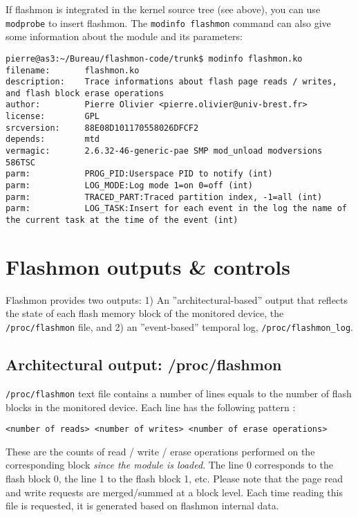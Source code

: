 \documentclass[11pt]{article}
\begin{document}
If flashmon is integrated in the kernel source tree (see above), you can use \verb+modprobe+ to insert flashmon. The \verb+modinfo flashmon+ command can also give some information about the module and its parameters:

\begin{verbatim}
pierre@as3:~/Bureau/flashmon-code/trunk$ modinfo flashmon.ko
filename:       flashmon.ko
description:    Trace informations about flash page reads / writes, and flash block erase operations
author:         Pierre Olivier <pierre.olivier@univ-brest.fr>
license:        GPL
srcversion:     88E08D101170558026DFCF2
depends:        mtd
vermagic:       2.6.32-46-generic-pae SMP mod_unload modversions 586TSC 
parm:           PROG_PID:Userspace PID to notify (int)
parm:           LOG_MODE:Log mode 1=on 0=off (int)
parm:           TRACED_PART:Traced partition index, -1=all (int)
parm:           LOG_TASK:Insert for each event in the log the name of the current task at the time of the event (int)
\end{verbatim}

\section{Flashmon outputs \& controls}

Flashmon provides two outputs: 1) An ''architectural-based'' output that reflects the state of each flash memory block of the monitored device, the \verb+/proc/flashmon+ file, and 2) an ''event-based'' temporal log, \verb+/proc/flashmon_log+.

\subsection{Architectural output: /proc/flashmon}

\verb+/proc/flashmon+ text file contains a number of lines equals to the number of flash blocks in the monitored device. Each line has the following pattern :

\begin{verbatim}
<number of reads> <number of writes> <number of erase operations>
\end{verbatim}

These are the counts of read / write / erase operations performed on the corresponding block \textit{since the module is loaded}. The line 0 corresponds to the flash block 0, the line 1 to the flash block 1, etc. Please note that the page read and write requests are merged/summed at a block level. Each time reading this file is requested, it is generated based on flashmon internal data.
\end{document}
